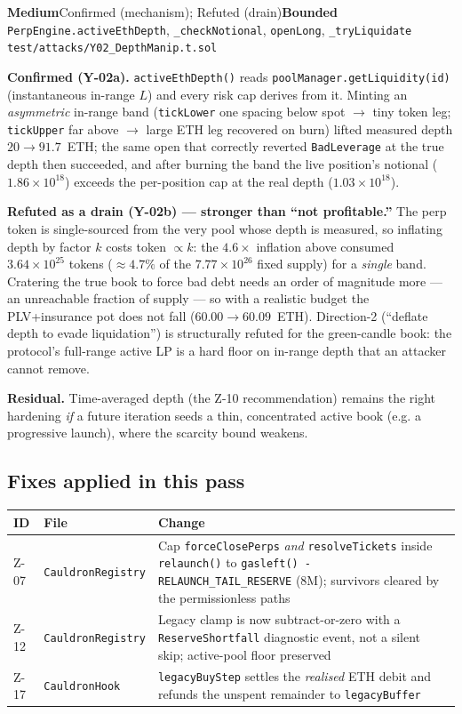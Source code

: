 \documentclass[10pt,a4paper]{article}
\newcommand{\sev}[2]{\textcolor{#1}{\textbf{#2}}}
\newcommand{\SevMed}{\sev{med}{Medium}}
\newcommand{\code}[1]{\texttt{\small #1}}
\begin{document}
{\SevMed}{Confirmed (mechanism); Refuted (drain)}{\textcolor{med}{\textbf{Bounded}}}
{\code{PerpEngine.activeEthDepth}, \code{\_checkNotional}, \code{openLong}, \code{\_tryLiquidate}}
{\code{test/attacks/Y02\_DepthManip.t.sol}}

\textbf{Confirmed (Y-02a).} \code{activeEthDepth()} reads
\code{poolManager.getLiquidity(id)} (instantaneous in-range $L$) and every risk cap
derives from it. Minting an \emph{asymmetric} in-range band (\code{tickLower} one
spacing below spot $\to$ tiny token leg; \code{tickUpper} far above $\to$ large ETH
leg recovered on burn) lifted measured depth $20\to91.7$~ETH; the same open that
correctly reverted \code{BadLeverage} at the true depth then succeeded, and after
burning the band the live position's notional ($1.86\times10^{18}$) exceeds the
per-position cap at the real depth ($1.03\times10^{18}$).

\textbf{Refuted as a drain (Y-02b) --- stronger than ``not profitable.''} The perp
token is single-sourced from the very pool whose depth is measured, so inflating
depth by factor $k$ costs token $\propto k$: the $4.6\times$ inflation above
consumed $3.64\times10^{25}$ tokens ($\approx4.7\%$ of the $7.77\times10^{26}$ fixed
supply) for a \emph{single} band. Cratering the true book to force bad debt needs an
order of magnitude more --- an unreachable fraction of supply --- so with a realistic
budget the PLV+insurance pot does not fall ($60.00\to60.09$~ETH). Direction-2
(``deflate depth to evade liquidation'') is structurally refuted for the green-candle
book: the protocol's full-range active LP is a hard floor on in-range depth that an
attacker cannot remove.

\textbf{Residual.} Time-averaged depth (the Z-10 recommendation) remains the right
hardening \emph{if} a future iteration seeds a thin, concentrated active book (e.g. a
progressive launch), where the scarcity bound weakens.

\subsection{Fixes applied in this pass}
\begin{center}\small
\begin{tabular}{@{}llp{7.4cm}@{}}
\toprule
\textbf{ID} & \textbf{File} & \textbf{Change} \\
\midrule
Z-07 & \code{CauldronRegistry} & Cap \code{forceClosePerps} \emph{and} \code{resolveTickets} inside \code{relaunch()} to \code{gasleft() - RELAUNCH\_TAIL\_RESERVE} (8M); survivors cleared by the permissionless paths \\
Z-12 & \code{CauldronRegistry} & Legacy clamp is now subtract-or-zero with a \code{ReserveShortfall} diagnostic event, not a silent skip; active-pool floor preserved \\
Z-17 & \code{CauldronHook} & \code{legacyBuyStep} settles the \emph{realised} ETH debit and refunds the unspent remainder to \code{legacyBuffer} \\
\bottomrule
\end{tabular}
\end{center}
\end{document}
